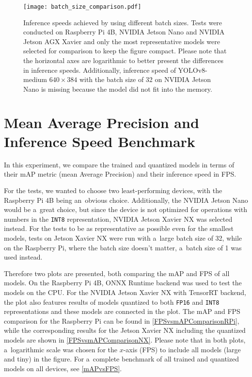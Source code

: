 \begin{figure}[H]
        \centering
        \texttt{[image: batch\_size\_comparison.pdf]}
        \caption{Inference speeds achieved by using different batch sizes. Tests
        were conducted on Raspberry Pi 4B, NVIDIA Jetson Nano and NVIDIA Jetson
        AGX Xavier and only the most representative models were selected for
        comparison to keep the figure compact. Please note that the horizontal
        axes are logarithmic to better present the differences in inference
        speeds. Additionally, inference speed of YOLOv8-medium $640 \times 384$
        with the batch size of 32 on NVIDIA Jetson Nano is missing because the
        model did not fit into the memory.}
        \label{BatchSizeComparison}
\end{figure}


\section{Mean Average Precision and Inference Speed Benchmark}
\label{FPSvsmAPComparison}

In this experiment, we compare the trained and quantized models in terms of
their mAP metric (mean Average Precision) and their inference speed in FPS.

For the tests, we wanted to choose two least-performing devices, with the
Raspberry Pi 4B being an~obvious choice. Additionally, the NVIDIA Jetson Nano
would be a~great choice, but since the device is not optimized for operations
with numbers in the \texttt{INT8} representation, NVIDIA Jetson Xavier NX was
selected instead. For the tests to be as representative as possible even for the
smallest models, tests on Jetson Xavier NX were run with a~large batch size of
32, while on the Raspberry Pi, where the batch size doesn't matter,
a~batch size of 1 was used instead.

Therefore two plots are presented, both comparing the mAP and FPS of all models.
On the Raspberry Pi 4B, ONNX Runtime backend was used to test the models on the
CPU. For the NVIDIA Jetson Xavier NX with TensorRT backend, the plot also
features results of models quantized to both \texttt{FP16} and \texttt{INT8}
representations and these models are connected in the plot. The mAP and FPS
comparison for the Raspberry Pi can be found in \autoref{FPSvsmAPComparisonRPi},
while the corresponding results for the Jetson Xavier NX including the quantized
models are shown in \autoref{FPSvsmAPComparisonNX}. Please note that in both
plots, a~logarithmic scale was chosen for the $x$-axis (FPS) to include all
models (large and tiny) in the figure. For a~complete benchmark of all trained
and quantized models on all devices, see \autoref{mAPvsFPS}.

